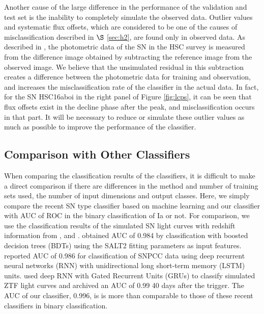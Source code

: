 \documentclass[useamsfonts]{pasj01}
\begin{document}
Another cause of the large difference in the performance of the validation and test set is the inability to completely simulate the observed data.
Outlier values and systematic flux offsets, which are considered to be one of the causes of misclassification described in $\S$ \ref{sec:h2}, are found only in observed data.
As described in \citet{yasuda19a}, the photometric data of the SN in the HSC survey is measured from the difference image obtained by subtracting the reference image from the observed image.
We believe that the unsimulated residual in this subtraction creates a difference between the photometric data for training and observation, and increases the misclassification rate of the classifier in the actual data.
In fact, for the SN HSC16aboi in the right panel of Figure \ref{fig:lcps}, it can be seen that flux offsets exist in the decline phase after the peak, and misclassification occurs in that part.
It will be necessary to reduce or simulate these outlier values as much as possible to improve the performance of the classifier.
%
%
%
\subsection{Comparison with Other Classifiers}
%
When comparing the classification results of the classifiers, it is difficult to make a direct comparison if there are differences in the method and number of training sets used, the number of input dimensions and output classes. 
Here, we simply compare the recent SN type classifier based on machine learning and our classifier with AUC of ROC in the binary classification of Ia or not.
For comparison, we use the classification results of the simulated SN light curves with redshift information from \citet{Lochner_2016}, \citet{charnock17a} and \citet{Muthukrishna_2019}.
\citet{Lochner_2016} obtained AUC of 0.984 by classification with boosted decision trees (BDTs) using the SALT2 fitting parameters as input features.
\citet{charnock17a} reported AUC of 0.986 for classification of SNPCC data using deep recurrent neural networks (RNN) with unidirectional long short-term memory (LSTM) units.
\citet{Muthukrishna_2019} used deep RNN with Gated Recurrent Units (GRUs) to classify simulated ZTF light curves and archived an AUC of 0.99 40 days after the trigger.
The AUC of our classifier, 0.996, is is more than comparable to those of these recent classifiers in binary classification.
\end{document}
